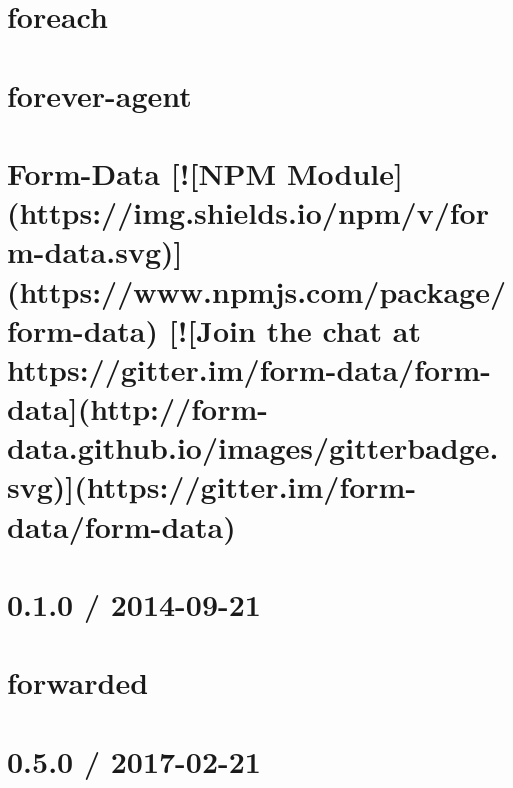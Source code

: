 \documentclass[twoside]{book}
\newcommand{\+}{\discretionary{\mbox{\scriptsize$\hookleftarrow$}}{}{}}
\begin{document}
\chapter{foreach}
\label{md__c_1_workspace_demo_src_main_script_node_modules_foreach__readme}

\chapter{forever-\/agent}
\label{md__c_1_workspace_demo_src_main_script_node_modules_forever-agent__r_e_a_d_m_e}

\chapter{Form-\/\+Data \mbox{[}!\mbox{[}N\+PM Module\mbox{]}(https\+://img.shields.\+io/npm/v/form-\/data.svg)\mbox{]}(https\+://www.npmjs.\+com/package/form-\/data) \mbox{[}!\mbox{[}Join the chat at https\+://gitter.im/form-\/data/form-\/data\mbox{]}(http\+://form-\/data.github.\+io/images/gitterbadge.svg)\mbox{]}(https\+://gitter.im/form-\/data/form-\/data)}
\label{md__c_1_workspace_demo_src_main_script_node_modules_form-data__r_e_a_d_m_e}

\chapter{0.1.0 / 2014-\/09-\/21}
\label{md__c_1_workspace_demo_src_main_script_node_modules_forwarded__h_i_s_t_o_r_y}

\chapter{forwarded}
\label{md__c_1_workspace_demo_src_main_script_node_modules_forwarded__r_e_a_d_m_e}

\chapter{0.5.0 / 2017-\/02-\/21}
\label{md__c_1_workspace_demo_src_main_script_node_modules_fresh__h_i_s_t_o_r_y}

\end{document}
